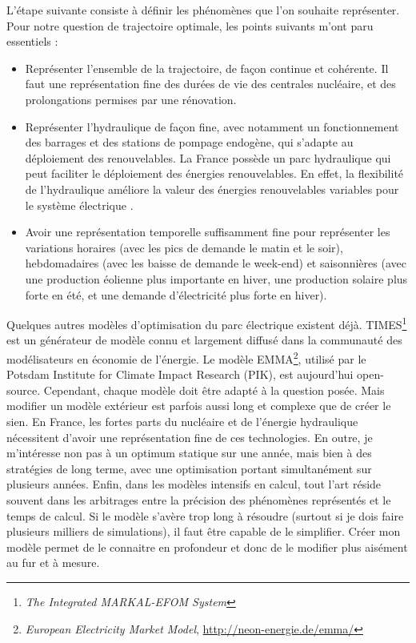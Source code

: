 L’étape suivante consiste à définir les phénomènes que l’on souhaite représenter. Pour notre question de trajectoire optimale, les points suivants m’ont paru essentiels :
\begin{itemize}
	\item Représenter l’ensemble de la trajectoire, de façon continue et cohérente. Il faut une représentation fine des durées de vie des centrales nucléaire, et des prolongations permises par une rénovation.
	\item Représenter l’hydraulique de façon fine, avec notamment un fonctionnement des barrages et des stations de pompage endogène, qui s’adapte au déploiement des renouvelables. La France possède un parc hydraulique qui peut faciliter le déploiement des énergies renouvelables. En effet, la flexibilité de l’hydraulique améliore la valeur des énergies renouvelables variables pour le système électrique \citep{Hirth2016a}.
	\item Avoir une représentation temporelle suffisamment fine pour représenter les variations horaires (avec les pics de demande le matin et le soir), hebdomadaires (avec les baisse de demande le week-end) et saisonnières (avec une production éolienne plus importante en hiver, une production solaire plus forte en été, et une demande d’électricité plus forte en hiver).
\end{itemize}

Quelques autres modèles d'optimisation du parc électrique existent déjà. TIMES\footnote{\textit{The Integrated MARKAL-EFOM System}} est un générateur de modèle connu et largement diffusé dans la communauté des modélisateurs en économie de l'énergie. Le modèle EMMA\footnote{\textit{European Electricity Market Model}, \url{http://neon-energie.de/emma/}}, utilisé par le Potsdam Institute for Climate Impact Research (PIK), est aujourd'hui open-source.
Cependant, chaque modèle doit être adapté à la question posée. Mais modifier un modèle extérieur est parfois aussi long et complexe que de créer le sien. En France, les fortes parts du nucléaire et de l'énergie hydraulique nécessitent d'avoir une représentation fine de ces technologies. 
En outre, je m'intéresse non pas à un optimum statique sur une année, mais bien à des stratégies de long terme, avec une optimisation portant simultanément sur plusieurs années. 
Enfin, dans les modèles intensifs en calcul, tout l'art réside souvent dans les arbitrages entre la précision des phénomènes représentés et le temps de calcul. Si le modèle s'avère trop long à résoudre (surtout si je dois faire plusieurs milliers de simulations), il faut être capable de le simplifier. Créer mon modèle permet de le connaitre en profondeur et donc de le modifier plus aisément au fur et à mesure.

